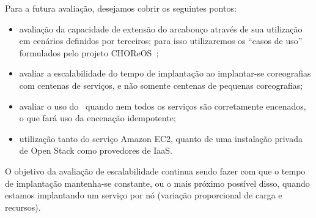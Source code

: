 Para a futura avaliação, desejamos cobrir os seguintes pontos:

\begin{itemize}
\item avaliação da capacidade de extensão do arcabouço através de sua utilização em cenários definidos por terceiros; para isso utilizaremos os ``casos de uso'' formulados pelo projeto CHOReOS~\cite{Choreos2011D6.1, Choreos2011D8.1};
\item avaliar a escalabilidade do tempo de implantação ao implantar-se coreografias com centenas de serviços, e não somente centenas de pequenas coreografias;
\item avaliar o uso do \ee\ quando nem todos os serviços são corretamente encenados, o que fará uso da encenação idempotente;
\item utilização tanto do serviço Amazon EC2, quanto de uma instalação privada de Open Stack como provedores de IaaS.
\end{itemize}

O objetivo da avaliação de escalabilidade continua sendo fazer com que o tempo de implantação mantenha-se constante, ou o mais próximo possível disso, quando estamos implantando um serviço por nó (variação proporcional de carga e recursos).

